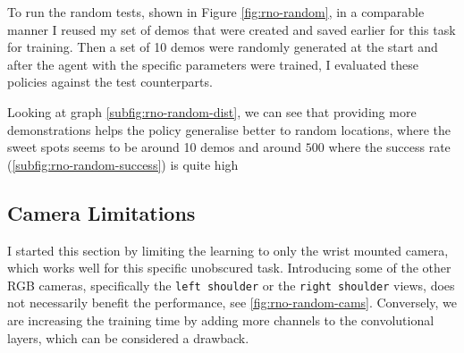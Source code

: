To run the random tests, shown in Figure \ref{fig:rno-random}, in a comparable manner I reused my set of demos that were created and saved earlier for this task for training. Then a set of 10 demos were randomly generated at the start and after the agent with the specific parameters were trained, I evaluated these policies against the test counterparts.

Looking at graph \ref{subfig:rno-random-dist}, we can see that providing more demonstrations helps the policy generalise better to random locations, where the sweet spots seems to be around 10 demos and around $500$ where the success rate (\ref{subfig:rno-random-success}) is quite high

\subsection{Camera Limitations}
I started this section by limiting the learning to only the wrist mounted camera, which works well for this specific unobscured task. Introducing some of the other RGB cameras, specifically the \verb|left shoulder| or the \verb|right shoulder| views, does not necessarily benefit the performance, see \ref{fig:rno-random-cams}. Conversely, we are increasing the training time by adding more channels to the convolutional layers, which can be considered a drawback.

